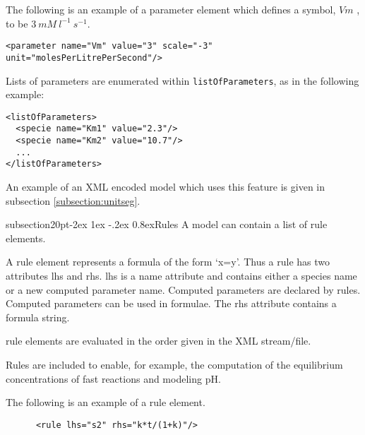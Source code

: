 \documentclass[10pt]{article}
\makeatletter
\renewcommand{\subsection}{\@startsection%
  {subsection}{2}{0pt}{-2ex \@plus 1ex \@minus -.2ex}%
  {0.8ex}{\slshape\large\bfseries}}
\newcommand{\tightspacing}{\renewcommand{\baselinestretch}{0.85}}
\newcommand{\regularspacing}{\renewcommand{\baselinestretch}{1.0}}
\newcommand{\class}[1]{\textsf{#1}}
\newcommand{\attrib}[1]{\textsf{#1}}
\makeatother
\begin{document}
The following is an example of a \class{parameter} element which defines a symbol,
$Vm$ , to be $3\ mM\ l^{-1}\ s^{-1}$.
\begin{small}
\tightspacing
\begin{verbatim}
<parameter name="Vm" value="3" scale="-3" unit="molesPerLitrePerSecond"/>
\end{verbatim}
\regularspacing
\end{small}

Lists of parameters are enumerated within {\tt listOfParameters},
as in the following example:

\begin{small}
\tightspacing
\begin{verbatim}
<listOfParameters>
  <specie name="Km1" value="2.3"/>
  <specie name="Km2" value="10.7"/>
  ...
</listOfParameters>
\end{verbatim}
\regularspacing
\end{small}


An example of an XML encoded model which
uses this feature is given in subsection \ref{subsection:unitseg}.

\subsection{Rules}
A model can contain a list of \class{rule} elements.

A \class{rule} element represents a formula of the form `x=y'.
Thus a rule has two attributes \attrib{lhs} and \attrib{rhs}.
\attrib{lhs} is a name attribute and contains either a species
name or a new computed parameter name. Computed parameters are
declared by rules.  Computed parameters can be used in formulae.
The \attrib{rhs} attribute contains a formula string.

\class{rule} elements are evaluated in the order given in the XML
stream/file.

Rules are included to enable, for example, the computation of the
equilibrium concentrations of fast reactions and modeling pH.

The following is an example of a \class{rule} element.
\begin{small}
\tightspacing
\begin{verbatim}
      <rule lhs="s2" rhs="k*t/(1+k)"/>
\end{verbatim}
\regularspacing
\end{small}
\end{document}
